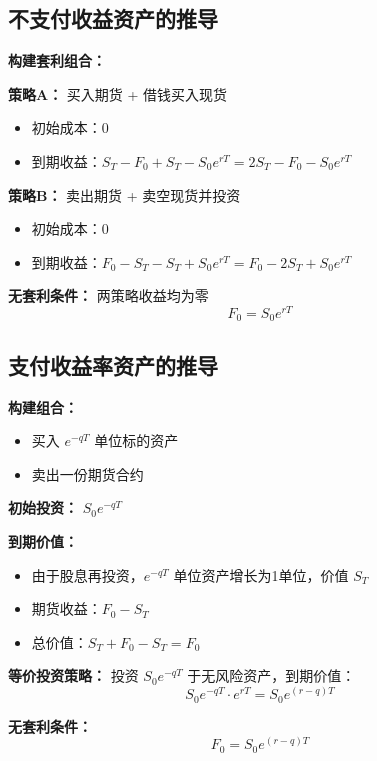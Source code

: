\subsection{不支付收益资产的推导}

\textbf{构建套利组合：}

\textbf{策略A：} 买入期货 + 借钱买入现货
\begin{itemize}
\item 初始成本：0
\item 到期收益：$S_T - F_0 + S_T - S_0e^{rT} = 2S_T - F_0 - S_0e^{rT}$
\end{itemize}

\textbf{策略B：} 卖出期货 + 卖空现货并投资
\begin{itemize}
\item 初始成本：0
\item 到期收益：$F_0 - S_T - S_T + S_0e^{rT} = F_0 - 2S_T + S_0e^{rT}$
\end{itemize}

\textbf{无套利条件：} 两策略收益均为零
\begin{equation}
F_0 = S_0 e^{rT}
\end{equation}

\subsection{支付收益率资产的推导}

\textbf{构建组合：}
\begin{itemize}
\item 买入 $e^{-qT}$ 单位标的资产
\item 卖出一份期货合约
\end{itemize}

\textbf{初始投资：} $S_0 e^{-qT}$

\textbf{到期价值：}
\begin{itemize}
\item 由于股息再投资，$e^{-qT}$ 单位资产增长为1单位，价值 $S_T$
\item 期货收益：$F_0 - S_T$
\item 总价值：$S_T + F_0 - S_T = F_0$
\end{itemize}

\textbf{等价投资策略：}
投资 $S_0 e^{-qT}$ 于无风险资产，到期价值：
\begin{equation}
S_0 e^{-qT} \cdot e^{rT} = S_0 e^{(r-q)T}
\end{equation}

\textbf{无套利条件：}
\begin{equation}
F_0 = S_0 e^{(r-q)T}
\end{equation}

